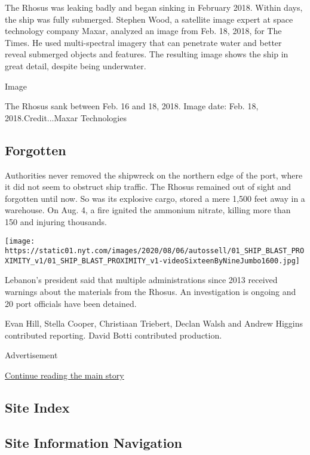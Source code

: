 The Rhosus was leaking badly and began sinking in February 2018. Within
days, the ship was fully submerged. Stephen Wood, a satellite image
expert at space technology company Maxar, analyzed an image from Feb.
18, 2018, for The Times. He used multi-spectral imagery that can
penetrate water and better reveal submerged objects and features. The
resulting image shows the ship in great detail, despite being
underwater.

Image

The Rhosus sank between Feb. 16 and 18, 2018. Image date: Feb. 18,
2018.Credit...Maxar Technologies

\hypertarget{forgotten}{%
\subsection{Forgotten}\label{forgotten}}

Authorities never removed the shipwreck on the northern edge of the
port, where it did not seem to obstruct ship traffic. The Rhosus
remained out of sight and forgotten until now. So was its explosive
cargo, stored a mere 1,500 feet away in a warehouse. On Aug. 4, a fire
ignited the ammonium nitrate, killing more than 150 and injuring
thousands.

\texttt{[image: https://static01.nyt.com/images/2020/08/06/autossell/01\_SHIP\_BLAST\_PROXIMITY\_v1/01\_SHIP\_BLAST\_PROXIMITY\_v1-videoSixteenByNineJumbo1600.jpg]}

Lebanon's president said that multiple administrations since 2013
received warnings about the materials from the Rhosus. An investigation
is ongoing and 20 port officials have been detained.

Evan Hill, Stella Cooper, Christiaan Triebert, Declan Walsh and Andrew
Higgins contributed reporting. David Botti contributed production.

Advertisement

\protect\hyperlink{after-bottom}{Continue reading the main story}

\hypertarget{site-index}{%
\subsection{Site Index}\label{site-index}}

\hypertarget{site-information-navigation}{%
\subsection{Site Information
Navigation}\label{site-information-navigation}}

